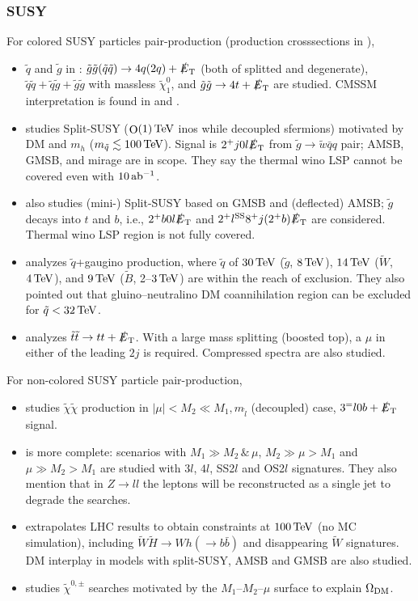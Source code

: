 \documentclass[10pt,a4paper]{article}
\newcommand{\TeV}{\,{\rm TeV}}
\newcommand{\iab}{\,{\rm ab^{-1}}}
\newcommand{\s}[1]{_{\rm #1}}
\newcommand{\Order}{\mathop{\mathrm O}}
\newcommand{\MET}{\slashed{E}\s T}
\begin{document}
\subsubsection{SUSY}
For colored SUSY particles pair-production (production crosssections in \cite{Borschensky:2014cia}),
\begin{itemize}

 \item $\tilde q$ and $\tilde g$ in \cite{Cohen:2013xda}: $\tilde g\tilde g(\tilde q\tilde q)\to 4q(2q)+\MET$ (both of splitted and degenerate), $\tilde q\tilde q+\tilde q\tilde g+\tilde g\tilde g$ with massless $\tilde\chi_1^0$, and $\tilde g\tilde g\to4t+\MET$ are studied. CMSSM interpretation is found in \cite{Fowlie:2014awa} and \cite{Fowlie:2014xha}.
 \item \cite{Jung:2013zya} studies Split-SUSY ($\Order(1)\TeV$ inos while decoupled sfermions) motivated by DM and $m_h$ ($m_{\tilde q}\lesssim100\TeV$). Signal is $2^+j0l\MET$ from $\tilde g\to \tilde w\bar qq$ pair; AMSB, GMSB, and mirage are in scope. They say the thermal wino LSP cannot be covered even with $10\iab$.
 \item \cite{Beauchesne:2015jra} also studies (mini-) Split-SUSY based on GMSB and (deflected) AMSB; $\tilde g$ decays into $t$ and $b$, i.e.,  $2^+b0l\MET$ and $2^+l^{\rm SS}8^+j(2^+b)\MET$ are considered. Thermal wino LSP region is not fully covered.
 \item \cite{Ellis:2015xba} analyzes $\tilde q$+gaugino production, where $\tilde q$ of $30\TeV$ ($\tilde g$, $8\TeV$), $14\TeV$ ($\tilde W$, $4\TeV$), and $9\TeV$ ($\tilde B$, 2--$3\TeV$) are within the reach of exclusion. They also pointed out that gluino--neutralino DM coannihilation region can be excluded for $\tilde q<32\TeV$.
\item \cite{Cohen:2014hxa} analyzes $\tilde t\tilde t\to tt+\MET$. With a large mass splitting (boosted top), a $\mu$ in either of the leading $2j$ is required. Compressed spectra are also studied.
 \end{itemize}
For non-colored SUSY particle pair-production,
 \begin{itemize}
 \item \cite{Acharya:2014pua} studies $\tilde\chi\tilde\chi$ production in $|\mu|<M_2\ll M_1, m_{\tilde l}$ (decoupled) case,  $3^{=}l0b+\MET$ signal.
 \item \cite{Gori:2014oua} is more complete: scenarios with $M_1\gg M_2\,\&\,\mu$, $M_2\gg\mu>M_1$ and $\mu\gg M_2>M_1$ are studied with $3l$, $4l$, SS2$l$ and OS2$l$ signatures. They also mention that in $Z\to ll$ the leptons will be reconstructed as a single jet to degrade the searches.
 \item \cite{diCortona:2014yua} extrapolates LHC results to obtain constraints at $100\TeV$ (no MC simulation), including $\tilde W\tilde H\to Wh(\to b\bar b)$ and disappearing $\tilde W$ signatures. DM interplay in models with split-SUSY, AMSB and GMSB are also studied.
 \item \cite{Bramante:2014tba} studies $\tilde\chi^{0,\pm}$ searches motivated by the $M_1$--$M_2$--$\mu$ surface to explain $\Omega\s{DM}$.
 \end{itemize}
\end{document}
